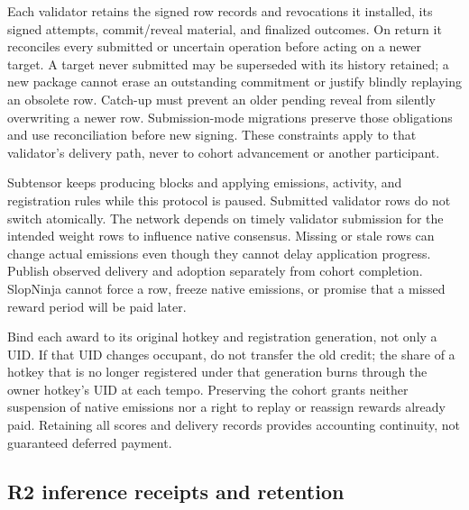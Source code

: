 Each validator retains the signed row records and revocations it installed, its
signed attempts, commit/reveal material, and finalized outcomes. On return it reconciles
every submitted or uncertain operation before acting on a newer target. A target
never submitted may be superseded with its history retained; a new package cannot
erase an outstanding commitment or justify blindly replaying an obsolete row.
Catch-up must prevent an older pending reveal from silently overwriting a newer
row. Submission-mode migrations preserve those obligations and use reconciliation
before new signing. These constraints apply to that validator's delivery path,
never to cohort advancement or another participant.

Subtensor keeps producing blocks and applying emissions, activity, and
registration rules while this protocol is paused. Submitted validator rows do
not switch atomically. The network depends on timely validator submission for
the intended weight rows to influence native consensus. Missing or stale rows
can change actual emissions even though they cannot delay application progress.
Publish observed delivery and adoption separately from cohort completion.
SlopNinja cannot force a row, freeze native emissions, or promise that a missed
reward period will be paid later.

Bind each award to its original hotkey and registration generation, not only a
UID. If that UID changes occupant, do not transfer the old credit; the share of
a hotkey that is no longer registered under that generation burns through the
owner hotkey's UID at each tempo. Preserving the cohort grants neither suspension
of native emissions nor a right to replay or reassign rewards already paid.
Retaining all scores and delivery records provides accounting continuity, not
guaranteed deferred payment.

\subsection{R2 inference receipts and retention}\label{cohort-receipt-retention}

